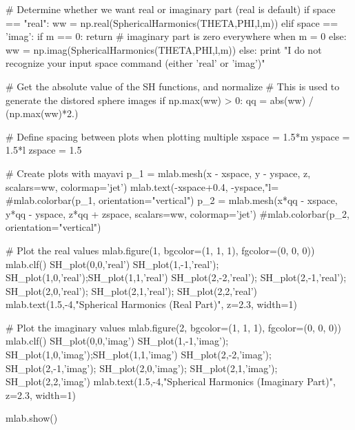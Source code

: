     # Determine whether we want real or imaginary part (real is default)
    if space == "real":
        ww = np.real(SphericalHarmonics(THETA,PHI,l,m))
    elif space == 'imag':
        if m == 0: return  # imaginary part is zero everywhere when m = 0
        else: ww = np.imag(SphericalHarmonics(THETA,PHI,l,m))
    else:
        print "I do not recognize your input space command (either 'real' or 'imag')"

    # Get the absolute value of the SH functions, and normalize
    # This is used to generate the distored sphere images
    if np.max(ww) > 0:
        qq = abs(ww) / (np.max(ww)*2.)

    # Define spacing between plots when plotting multiple
    xspace = 1.5*m
    yspace = 1.5*l
    zspace = 1.5

    # Create plots with mayavi
    p_1 = mlab.mesh(x - xspace, y - yspace, z, scalars=ww, colormap='jet')
    mlab.text(-xspace+0.4, -yspace,"l=%
    #mlab.colorbar(p_1, orientation="vertical")
    p_2 = mlab.mesh(x*qq - xspace, y*qq - yspace, z*qq + zspace, scalars=ww, colormap='jet')
    #mlab.colorbar(p_2, orientation="vertical")

# Plot the real values
mlab.figure(1, bgcolor=(1, 1, 1), fgcolor=(0, 0, 0))
mlab.clf()
SH_plot(0,0,'real')
SH_plot(1,-1,'real'); SH_plot(1,0,'real');SH_plot(1,1,'real')
SH_plot(2,-2,'real'); SH_plot(2,-1,'real'); SH_plot(2,0,'real'); SH_plot(2,1,'real'); SH_plot(2,2,'real')
mlab.text(1.5,-4,"Spherical Harmonics (Real Part)", z=2.3, width=1)

# Plot the imaginary values
mlab.figure(2, bgcolor=(1, 1, 1), fgcolor=(0, 0, 0))
mlab.clf()
SH_plot(0,0,'imag')
SH_plot(1,-1,'imag'); SH_plot(1,0,'imag');SH_plot(1,1,'imag')
SH_plot(2,-2,'imag'); SH_plot(2,-1,'imag'); SH_plot(2,0,'imag'); SH_plot(2,1,'imag'); SH_plot(2,2,'imag')
mlab.text(1.5,-4,"Spherical Harmonics (Imaginary Part)", z=2.3, width=1)

mlab.show()
